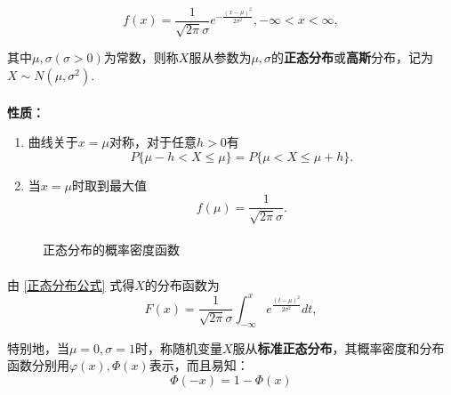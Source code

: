 \begin{equation}
  \label{正态分布公式}
  f(x) = \frac{1}{\sqrt{2\pi}\sigma}e^{-\frac{(x-\mu)^2}{2\sigma^2}}, -\infty < x < \infty,
\end{equation}

其中$\mu, \sigma(\sigma > 0)$为常数，则称$X$服从参数为$\mu, \sigma$的\textbf{正态分布}或\textbf{高斯}分布，记为$X\sim N(\mu, \sigma^2)$.

\paragraph{}
\textbf{性质：}
\begin{enumerate}
  \item 曲线关于$x=\mu$对称，对于任意$h > 0$有
  \begin{equation}
    P\{\mu-h < X \leq \mu\} = P\{\mu < X \leq \mu+h\}.
  \end{equation}
  \item 当$x=\mu$时取到最大值
  \begin{equation}
    f(\mu) = \frac{1}{\sqrt{2\pi}\sigma}.
  \end{equation}
\end{enumerate}

\paragraph{}
\begin{figure}[H]
\centering
  \begin{subfigure}[t]{0.48\linewidth}
    \centering
      
  \end{subfigure}
  \begin{subfigure}[t]{0.48\linewidth}
    \centering
      
  \end{subfigure}
  \caption{正态分布的概率密度函数}
  \label{正态分布的概率密度函数}
\end{figure}

\paragraph{}
由 \eqref{正态分布公式} 式得$X$的分布函数为
\begin{equation}
  F(x) = \frac{1}{\sqrt{2\pi}\sigma}\int_{-\infty}^x e^{\frac{(t-\mu)^2}{2\sigma^2}}dt,
\end{equation}

特别地，当$\mu=0, \sigma=1$时，称随机变量$X$服从\textbf{标准正态分布}，其概率密度和分布函数分别用$\varphi(x), \Phi(x)$表示，而且易知：
\begin{equation}
  \Phi(-x) = 1 - \Phi(x)
\end{equation}

